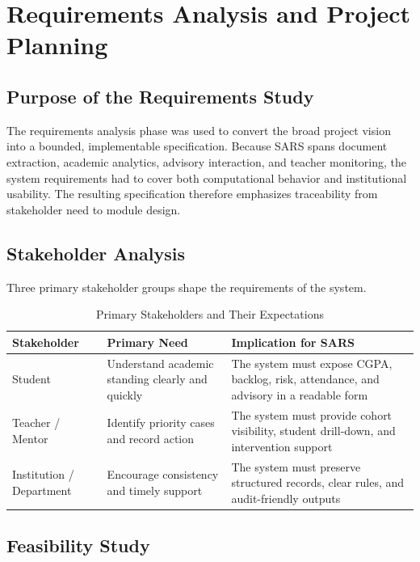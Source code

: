 \chapter{Requirements Analysis and Project Planning}

\section{Purpose of the Requirements Study}
The requirements analysis phase was used to convert the broad project vision into a bounded, implementable specification. Because SARS spans document extraction, academic analytics, advisory interaction, and teacher monitoring, the system requirements had to cover both computational behavior and institutional usability. The resulting specification therefore emphasizes traceability from stakeholder need to module design.

\section{Stakeholder Analysis}
Three primary stakeholder groups shape the requirements of the system.

\begin{table}[H]
\centering
\caption{Primary Stakeholders and Their Expectations}
\begin{tabularx}{\textwidth}{>{\raggedright\arraybackslash}p{} >{\raggedright\arraybackslash}p{} >{\raggedright\arraybackslash}X}
\toprule
\textbf{Stakeholder} & \textbf{Primary Need} & \textbf{Implication for SARS} \\
\midrule
Student & Understand academic standing clearly and quickly & The system must expose CGPA, backlog, risk, attendance, and advisory in a readable form \\
Teacher / Mentor & Identify priority cases and record action & The system must provide cohort visibility, student drill-down, and intervention support \\
Institution / Department & Encourage consistency and timely support & The system must preserve structured records, clear rules, and audit-friendly outputs \\
\bottomrule
\end{tabularx}
\end{table}

\section{Feasibility Study}
